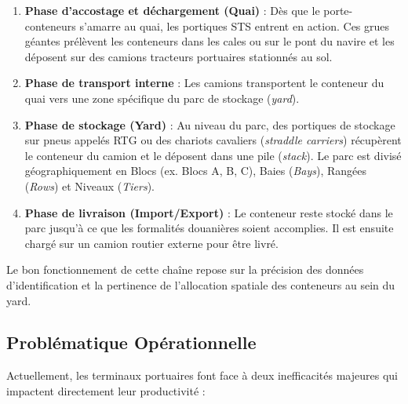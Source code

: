 \documentclass[12pt,a4paper]{article}
\begin{document}
\begin{enumerate}
  \item \textbf{Phase d'accostage et déchargement (Quai)} : Dès que le porte-conteneurs s'amarre au quai, les portiques \ac{STS} entrent en action. Ces grues géantes prélèvent les conteneurs dans les cales ou sur le pont du navire et les déposent sur des camions tracteurs portuaires stationnés au sol.
  \item \textbf{Phase de transport interne} : Les camions transportent le conteneur du quai vers une zone spécifique du parc de stockage (\textit{yard}).
  \item \textbf{Phase de stockage (Yard)} : Au niveau du parc, des portiques de stockage sur pneus appelés \ac{RTG} ou des chariots cavaliers (\textit{straddle carriers}) récupèrent le conteneur du camion et le déposent dans une pile (\textit{stack}). Le parc est divisé géographiquement en Blocs (ex. Blocs A, B, C), Baies (\textit{Bays}), Rangées (\textit{Rows}) et Niveaux (\textit{Tiers}).
  \item \textbf{Phase de livraison (Import/Export)} : Le conteneur reste stocké dans le parc jusqu'à ce que les formalités douanières soient accomplies. Il est ensuite chargé sur un camion routier externe pour être livré.
\end{enumerate}

Le bon fonctionnement de cette chaîne repose sur la précision des données d'identification et la pertinence de l'allocation spatiale des conteneurs au sein du yard.

\subsection{Problématique Opérationnelle}

Actuellement, les terminaux portuaires font face à deux inefficacités majeures qui impactent directement leur productivité :
\end{document}
